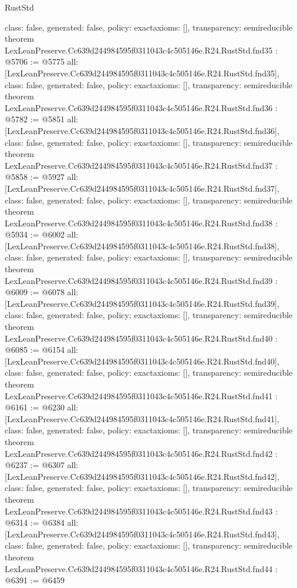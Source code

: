 \begin{lexlean}{RustStd}
\begin{coremodule}
{  class: false,
  generated: false,
  policy: exact{axioms: []},
  transparency: semireducible
}
theorem LexLeanPreserve.Cc639d244984595f0311043c4c505146e.R24.RustStd.fnd35 : @5706 := @5775 {
  all: [LexLeanPreserve.Cc639d244984595f0311043c4c505146e.R24.RustStd.fnd35],
  class: false,
  generated: false,
  policy: exact{axioms: []},
  transparency: semireducible
}
theorem LexLeanPreserve.Cc639d244984595f0311043c4c505146e.R24.RustStd.fnd36 : @5782 := @5851 {
  all: [LexLeanPreserve.Cc639d244984595f0311043c4c505146e.R24.RustStd.fnd36],
  class: false,
  generated: false,
  policy: exact{axioms: []},
  transparency: semireducible
}
theorem LexLeanPreserve.Cc639d244984595f0311043c4c505146e.R24.RustStd.fnd37 : @5858 := @5927 {
  all: [LexLeanPreserve.Cc639d244984595f0311043c4c505146e.R24.RustStd.fnd37],
  class: false,
  generated: false,
  policy: exact{axioms: []},
  transparency: semireducible
}
theorem LexLeanPreserve.Cc639d244984595f0311043c4c505146e.R24.RustStd.fnd38 : @5934 := @6002 {
  all: [LexLeanPreserve.Cc639d244984595f0311043c4c505146e.R24.RustStd.fnd38],
  class: false,
  generated: false,
  policy: exact{axioms: []},
  transparency: semireducible
}
theorem LexLeanPreserve.Cc639d244984595f0311043c4c505146e.R24.RustStd.fnd39 : @6009 := @6078 {
  all: [LexLeanPreserve.Cc639d244984595f0311043c4c505146e.R24.RustStd.fnd39],
  class: false,
  generated: false,
  policy: exact{axioms: []},
  transparency: semireducible
}
theorem LexLeanPreserve.Cc639d244984595f0311043c4c505146e.R24.RustStd.fnd40 : @6085 := @6154 {
  all: [LexLeanPreserve.Cc639d244984595f0311043c4c505146e.R24.RustStd.fnd40],
  class: false,
  generated: false,
  policy: exact{axioms: []},
  transparency: semireducible
}
theorem LexLeanPreserve.Cc639d244984595f0311043c4c505146e.R24.RustStd.fnd41 : @6161 := @6230 {
  all: [LexLeanPreserve.Cc639d244984595f0311043c4c505146e.R24.RustStd.fnd41],
  class: false,
  generated: false,
  policy: exact{axioms: []},
  transparency: semireducible
}
theorem LexLeanPreserve.Cc639d244984595f0311043c4c505146e.R24.RustStd.fnd42 : @6237 := @6307 {
  all: [LexLeanPreserve.Cc639d244984595f0311043c4c505146e.R24.RustStd.fnd42],
  class: false,
  generated: false,
  policy: exact{axioms: []},
  transparency: semireducible
}
theorem LexLeanPreserve.Cc639d244984595f0311043c4c505146e.R24.RustStd.fnd43 : @6314 := @6384 {
  all: [LexLeanPreserve.Cc639d244984595f0311043c4c505146e.R24.RustStd.fnd43],
  class: false,
  generated: false,
  policy: exact{axioms: []},
  transparency: semireducible
}
theorem LexLeanPreserve.Cc639d244984595f0311043c4c505146e.R24.RustStd.fnd44 : @6391 := @6459 {
}
\end{coremodule}
\end{lexlean}
